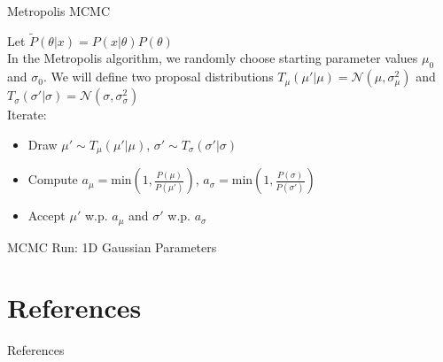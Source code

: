 \documentclass{beamer}					%
\begin{document}
\begin{frame}{Metropolis MCMC}

Let $\tilde{P}(\theta|x) = P(x|\theta)P(\theta)$\\
\vspace{0.1in}
In the Metropolis algorithm, we randomly choose starting parameter values $\mu_{0}$ and $\sigma_{0}$. We will define two proposal distributions $T_{\mu}(\mu'|\mu) = \mathcal{N}(\mu,\sigma_{\mu}^{2})$ and $T_{\sigma}(\sigma'|\sigma) = \mathcal{N}(\sigma,\sigma_{\sigma}^{2})$\\
\vspace{0.2in}
Iterate:
\begin{itemize}
\item Draw $\mu'\sim T_{\mu}(\mu'|\mu)$, $\sigma'\sim T_{\sigma}(\sigma'|\sigma)$
\item Compute $a_{\mu} = \mathrm{min}\left(1,\frac{P(\mu)}{P(\mu')}\right)$, $a_{\sigma} = \mathrm{min}\left(1,\frac{P(\sigma)}{P(\sigma')}\right)$
\item Accept $\mu'$ w.p. $a_{\mu}$ and $\sigma'$ w.p. $a_{\sigma}$ 
\end{itemize}

\end{frame}

\begin{frame}{MCMC Run: 1D Gaussian Parameters}
\end{frame}


\section{References}

\begin{frame}[allowframebreaks]{References}
	\tiny
	
\end{frame}
\end{document}
